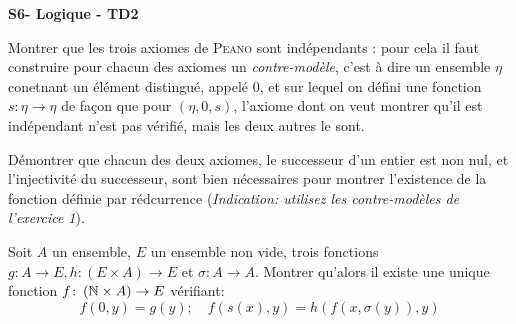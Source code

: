 \documentclass[french]{report}
\begin{document}
\begin{center}
    \huge{\textbf{S6- Logique - TD2}}
\end{center}

\begin{exo}
    Montrer que les trois axiomes de \textsc{Peano} sont indépendants : pour cela il
    faut construire pour chacun des axiomes un \textit{contre-modèle}, c'est à dire
    un ensemble \(\eta\) conetnant un élément distingué, appelé \(0\), et sur lequel
    on défini une fonction \(s:\eta\to\eta\) de façon que pour \(\left(\eta,0,s\right)\),
    l'axiome dont on veut montrer qu'il est indépendant n'est pas vérifié, mais les
    deux autres le sont.
\end{exo}

\begin{exo}
    Démontrer que chacun des deux axiomes, le successeur d'un entier est non nul, et
    l'injectivité du successeur, sont bien nécessaires pour montrer l'existence de
    la fonction définie par rédcurrence (\textit{Indication: utilisez les contre-modèles
    de l'exercice 1}).
\end{exo}

\begin{exo}
    Soit \(A\) un ensemble, \(E\) un ensemble non vide, trois fonctions \(g\colon A\to E,
    h\colon (E\times A)\to E\) et \(\sigma\colon A\to A\). Montrer qu'alors il existe
    une unique fonction \(f\colon\left(\mathbb{N}\times A\right)\to E\) vérifiant:
    \[f(0,y)=g(y);\quad f(s(x),y) = h(f(x,\sigma(y)),y)\]
\end{exo}
\end{document}
